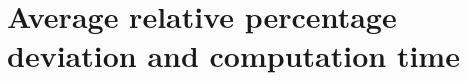 \newpage\cleardoublepage{}
\section{Average relative percentage deviation and computation time}
\label{app:report}